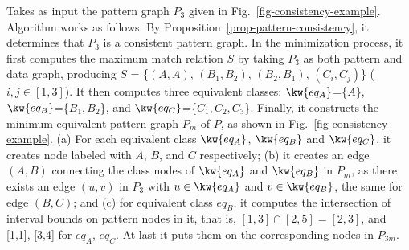 
\begin{example}
Takes as input the pattern graph $P_3$ given in Fig.~\ref{fig-consistency-example}. Algorithm works as follows. By Proposition~\ref{prop-pattern-consistency}, it determines that $P_3$ is a consistent pattern graph. In the minimization process, it first computes the maximum match relation $S$ by taking $P_3$ as both pattern and data graph, producing $S$ = \{$(A, A)$, $(B_1, B_2)$, $(B_2, B_1)$, $(C_i, C_j)$\} ($i,j \in [1,3]$). It then computes three equivalent classes: $\kw{eq_A}$=\{$A$\}, $\kw{eq_B}$=\{$B_1, B_2$\}, and $\kw{eq_C}$=\{$C_1, C_2, C_3$\}. Finally, it constructs the minimum equivalent pattern graph $P_m$ of $P$, as shown in Fig.~\ref{fig-consistency-example}. (a) For each equivalent class $\kw{eq_A}$, $\kw{eq_B}$ and $\kw{eq_C}$, it creates node labeled with $A$, $B$, and $C$ respectively; (b) it creates an edge $(A,B)$ connecting the class nodes of $\kw{eq_A}$ and $\kw{eq_B}$ in $P_m$, as there exists an edge $(u,v)$ in $P_3$ with $u \in \kw{eq_A}$ and $v \in \kw{eq_B}$, the same for edge $(B,C)$; and (c) for equivalent class $eq_B$, it computes the intersection of interval bounds on pattern nodes in it, that is, $[1,3]\cap[2,5] = [2,3]$, and [1,1], [3,4] for $eq_A$, $eq_C$. At last it puts them on the corresponding nodes in $P_{3m}$.
\end{example}

